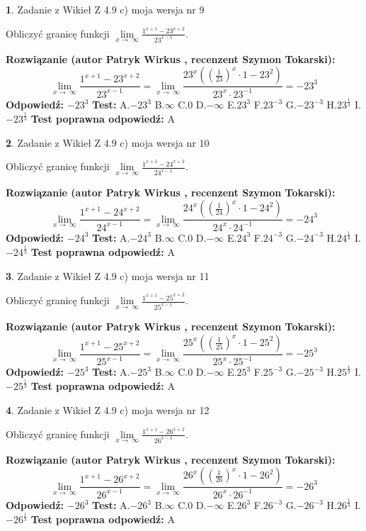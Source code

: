 \documentclass[12pt, a4paper]{article}
\theoremstyle{definition} %
\newtheorem{zad}{}
\newcommand{\zadStart}[1]{\begin{zad}#1\newline}
\newcommand{\zadStop}{\end{zad}}
\newcommand{\rozwStart}[2]{\noindent \textbf{Rozwiązanie (autor #1 , recenzent #2): }\newline}
\newcommand{\rozwStop}{\newline}
\newcommand{\odpStart}{\noindent \textbf{Odpowiedź:}\newline}
\newcommand{\odpStop}{\newline}
\newcommand{\testStart}{\noindent \textbf{Test:}\newline}
\newcommand{\testStop}{\newline}
\newcommand{\kluczStart}{\noindent \textbf{Test poprawna odpowiedź:}\newline}
\newcommand{\kluczStop}{\newline}
\begin{document}
\zadStart{Zadanie z Wikieł Z 4.9 c) moja wersja nr 9}


Obliczyć granicę funkcji  $\lim\limits_{x\to\ \infty}\frac{1^{x+1}-23^{x+2}}{23^{x-1}}$.
\zadStop
\rozwStart{Patryk Wirkus}{Szymon Tokarski}
$$\lim\limits_{x\to\ \infty}\frac{1^{x+1}-23^{x+2}}{23^{x-1}}=\lim\limits_{x\to\ \infty}\frac{23^{x}((\frac{1}{23})^{x}\cdot 1 -23^{2})}{23^{x}\cdot 23^{-1}} = -23^{3}$$
\rozwStop
\odpStart
$-23^{3}$
\odpStop
\testStart
A.$-23^{3}$ B.$\infty$ C.$0$ D.$-\infty$ E.$23^{3}$
F.$23^{-3}$ G.$-23^{-3}$
H.$23^{\frac{1}{3}}$
I.$-23^{\frac{1}{3}}$
\testStop
\kluczStart
A
\kluczStop



\zadStart{Zadanie z Wikieł Z 4.9 c) moja wersja nr 10}


Obliczyć granicę funkcji  $\lim\limits_{x\to\ \infty}\frac{1^{x+1}-24^{x+2}}{24^{x-1}}$.
\zadStop
\rozwStart{Patryk Wirkus}{Szymon Tokarski}
$$\lim\limits_{x\to\ \infty}\frac{1^{x+1}-24^{x+2}}{24^{x-1}}=\lim\limits_{x\to\ \infty}\frac{24^{x}((\frac{1}{24})^{x}\cdot 1 -24^{2})}{24^{x}\cdot 24^{-1}} = -24^{3}$$
\rozwStop
\odpStart
$-24^{3}$
\odpStop
\testStart
A.$-24^{3}$ B.$\infty$ C.$0$ D.$-\infty$ E.$24^{3}$
F.$24^{-3}$ G.$-24^{-3}$
H.$24^{\frac{1}{3}}$
I.$-24^{\frac{1}{3}}$
\testStop
\kluczStart
A
\kluczStop



\zadStart{Zadanie z Wikieł Z 4.9 c) moja wersja nr 11}


Obliczyć granicę funkcji  $\lim\limits_{x\to\ \infty}\frac{1^{x+1}-25^{x+2}}{25^{x-1}}$.
\zadStop
\rozwStart{Patryk Wirkus}{Szymon Tokarski}
$$\lim\limits_{x\to\ \infty}\frac{1^{x+1}-25^{x+2}}{25^{x-1}}=\lim\limits_{x\to\ \infty}\frac{25^{x}((\frac{1}{25})^{x}\cdot 1 -25^{2})}{25^{x}\cdot 25^{-1}} = -25^{3}$$
\rozwStop
\odpStart
$-25^{3}$
\odpStop
\testStart
A.$-25^{3}$ B.$\infty$ C.$0$ D.$-\infty$ E.$25^{3}$
F.$25^{-3}$ G.$-25^{-3}$
H.$25^{\frac{1}{3}}$
I.$-25^{\frac{1}{3}}$
\testStop
\kluczStart
A
\kluczStop



\zadStart{Zadanie z Wikieł Z 4.9 c) moja wersja nr 12}


Obliczyć granicę funkcji  $\lim\limits_{x\to\ \infty}\frac{1^{x+1}-26^{x+2}}{26^{x-1}}$.
\zadStop
\rozwStart{Patryk Wirkus}{Szymon Tokarski}
$$\lim\limits_{x\to\ \infty}\frac{1^{x+1}-26^{x+2}}{26^{x-1}}=\lim\limits_{x\to\ \infty}\frac{26^{x}((\frac{1}{26})^{x}\cdot 1 -26^{2})}{26^{x}\cdot 26^{-1}} = -26^{3}$$
\rozwStop
\odpStart
$-26^{3}$
\odpStop
\testStart
A.$-26^{3}$ B.$\infty$ C.$0$ D.$-\infty$ E.$26^{3}$
F.$26^{-3}$ G.$-26^{-3}$
H.$26^{\frac{1}{3}}$
I.$-26^{\frac{1}{3}}$
\testStop
\kluczStart
A
\kluczStop
\end{document}
